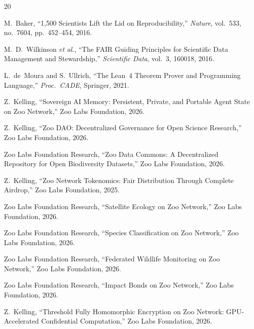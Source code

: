 \begin{thebibliography}{20}

M.~Baker,
``1,500 Scientists Lift the Lid on Reproducibility,''
\textit{Nature}, vol.~533, no.~7604, pp.~452--454, 2016.

M.~D.~Wilkinson \textit{et al.},
``The FAIR Guiding Principles for Scientific Data Management and Stewardship,''
\textit{Scientific Data}, vol.~3, 160018, 2016.

L.~de~Moura and S.~Ullrich,
``The Lean~4 Theorem Prover and Programming Language,''
\textit{Proc.\ CADE}, Springer, 2021.

Z.~Kelling,
``Sovereign AI Memory: Persistent, Private, and Portable Agent State on Zoo Network,''
Zoo Labs Foundation, 2026.

Z.~Kelling,
``Zoo DAO: Decentralized Governance for Open Science Research,''
Zoo Labs Foundation, 2026.

Zoo Labs Foundation Research,
``Zoo Data Commons: A Decentralized Repository for Open Biodiversity Datasets,''
Zoo Labs Foundation, 2026.

Z.~Kelling,
``Zoo Network Tokenomics: Fair Distribution Through Complete Airdrop,''
Zoo Labs Foundation, 2025.

Zoo Labs Foundation Research,
``Satellite Ecology on Zoo Network,''
Zoo Labs Foundation, 2026.

Zoo Labs Foundation Research,
``Species Classification on Zoo Network,''
Zoo Labs Foundation, 2026.

Zoo Labs Foundation Research,
``Federated Wildlife Monitoring on Zoo Network,''
Zoo Labs Foundation, 2026.

Zoo Labs Foundation Research,
``Impact Bonds on Zoo Network,''
Zoo Labs Foundation, 2026.

Z.~Kelling,
``Threshold Fully Homomorphic Encryption on Zoo Network: GPU-Accelerated Confidential Computation,''
Zoo Labs Foundation, 2026.

\end{thebibliography}

